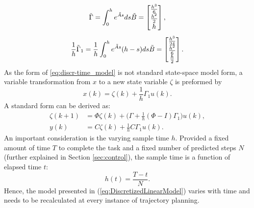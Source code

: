 \documentclass[final]{LTHtwocol} %
\begin{document}
\begin{equation}
    \Tilde{\Gamma} = \int_0^h e^{\Tilde{A}s}ds\Tilde{B} = 
    \begin{bmatrix}
        \frac{h^3}{6} \\ \frac{h^2}{2} \\ h
    \end{bmatrix},
\end{equation}
\begin{equation}
    \frac{1}{h}\Tilde{\Gamma}_1 = \frac{1}{h}\int_0^h e^{\Tilde{A}s}(h-s)ds\Tilde{B} = 
    \begin{bmatrix}
        \frac{h^3}{24} \\ \frac{h^2}{6} \\ \frac{h}{2}
    \end{bmatrix}.
\end{equation}
As the form of \eqref{eq:discr-time_model} is not standard state-space model form, a variable transformation \cite{Wittenmark} from $x$ to a new state variable $\zeta$ is preformed by 
\begin{equation}
    x(k) = \zeta(k) + \frac{1}{h}\Gamma_1u(k).
    \label{State_Vari_Trans}
\end{equation}
A standard form can be derived as:
\begin{equation}
    \begin{split}
        \zeta(k+1) & = \Phi\zeta(k) + \Big ( \Gamma+\frac{1}{h}(\Phi-I)\Gamma_1\Big )u(k), \\
        y(k) & = C\zeta(k) + \frac{1}{h}C\Gamma_1u(k).\label{eq:DiscretizedLinearModel}
    \end{split}
\end{equation}
An important consideration is the varying sample time $h$. Provided a fixed amount of time $T$ to complete the task and a fixed number of predicted steps $N$ (further explained in Section \ref{sec:control}), the sample time is a function of elapsed time $t$:
\begin{equation}
    \label{eq:sample_period}
    h(t) = \frac{T-t}{N}.
\end{equation}
Hence, the model presented in (\ref{eq:DiscretizedLinearModel}) varies with time and needs to be recalculated at every instance of trajectory planning.
\end{document}
